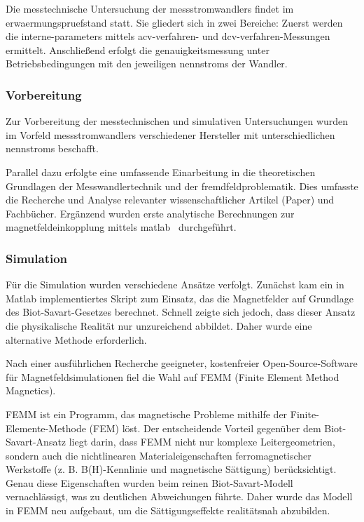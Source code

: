 Die messtechnische Untersuchung der \glspl{messstromwandler} findet im \gls{erwaermungspruefstand} statt. Sie gliedert sich in zwei Bereiche: Zuerst werden die \glspl{interne-parameter} mittels \gls{acv-verfahren}- und \gls{dcv-verfahren}-Messungen ermittelt. Anschließend erfolgt die \gls{genauigkeitsmessung} unter Betriebsbedingungen mit den jeweiligen \glspl{nennstrom} der Wandler.

\subsubsection{Vorbereitung}
\label{sec:vorgehen:vorbereitung}

Zur Vorbereitung der messtechnischen und simulativen Untersuchungen wurden im Vorfeld \glspl{messstromwandler} verschiedener Hersteller mit unterschiedlichen \glspl{nennstrom} beschafft.

Parallel dazu erfolgte eine umfassende Einarbeitung in die theoretischen Grundlagen der Messwandlertechnik und der \gls{fremdfeld}problematik. Dies umfasste die Recherche und Analyse relevanter wissenschaftlicher Artikel (Paper) und Fachbücher. Ergänzend wurden erste analytische Berechnungen zur \gls{magnetfeldeinkopplung} mittels \gls{matlab}  durchgeführt.

\subsubsection{Simulation}
\label{sec:vorgehen:simulation}

Für die Simulation wurden verschiedene Ansätze verfolgt. Zunächst kam ein in Matlab implementiertes Skript zum Einsatz, das die Magnetfelder auf Grundlage des Biot-Savart-Gesetzes berechnet. Schnell zeigte sich jedoch, dass dieser Ansatz die physikalische Realität nur unzureichend abbildet. Daher wurde eine alternative Methode erforderlich.

Nach einer ausführlichen Recherche geeigneter, kostenfreier Open-Source-Software für Magnetfeldsimulationen fiel die Wahl auf FEMM (Finite Element Method Magnetics).

FEMM ist ein Programm, das magnetische Probleme mithilfe der Finite-Elemente-Methode (FEM) löst. Der entscheidende Vorteil gegenüber dem Biot-Savart-Ansatz liegt darin, dass FEMM nicht nur komplexe Leitergeometrien, sondern auch die nichtlinearen Materialeigenschaften ferromagnetischer Werkstoffe (z. B. B(H)-Kennlinie und magnetische Sättigung) berücksichtigt. Genau diese Eigenschaften wurden beim reinen Biot-Savart-Modell vernachlässigt, was zu deutlichen Abweichungen führte. Daher wurde das Modell in FEMM neu aufgebaut, um die Sättigungseffekte realitätsnah abzubilden.

